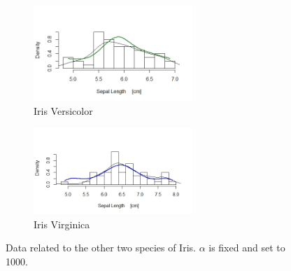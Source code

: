 \begin{figure}[ht]
	
	\begin{subfigure}{.5\textwidth}
		\includegraphics[width=6cm]{./pictures/iris/versicolor_100.jpeg} 
		\caption*{Iris Versicolor}
		\label{fig:versicolor}
	\end{subfigure}
	\begin{subfigure}{.5\textwidth}
		\includegraphics[width=6cm]{./pictures/iris/virginica_1000.jpeg}
		\caption*{Iris Virginica}
		\label{fig:virginica}
	\end{subfigure}
		
	\caption{Data related to the other two species of Iris. $\alpha$ is fixed and set to 1000.}
	\label{fig:iris_v}
	
\end{figure}








